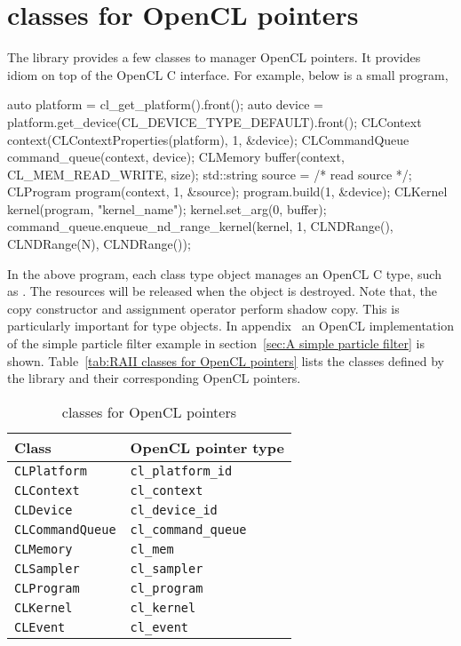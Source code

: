 \section{\protect\raii classes for OpenCL pointers}
\label{sec:RAII classes for OpenCL pointers}

The library provides a few classes to manager OpenCL pointers. It provides
\raii idiom on top of the OpenCL C interface. For example, below is a small
program,
\begin{cppcode}
  auto platform = cl_get_platform().front();
  auto device = platform.get_device(CL_DEVICE_TYPE_DEFAULT).front();
  CLContext context(CLContextProperties(platform), 1, &device);
  CLCommandQueue command_queue(context, device);
  CLMemory buffer(context, CL_MEM_READ_WRITE, size);
  std::string source = /* read source */;
  CLProgram program(context, 1, &source);
  program.build(1, &device);
  CLKernel kernel(program, "kernel_name");
  kernel.set_arg(0, buffer);
  command_queue.enqueue_nd_range_kernel(kernel, 1, CLNDRange(), CLNDRange(N),
      CLNDRange());
\end{cppcode}
In the above program, each class type object manages an OpenCL C type, such as
. The resources will be released when the object is
destroyed. Note that, the copy constructor and assignment operator perform
shadow copy. This is particularly important for  type
objects. In appendix~
an OpenCL implementation of the simple particle filter example in
section~\ref{sec:A simple particle filter} is shown. Table~\ref{tab:RAII
  classes for OpenCL pointers} lists the classes defined by the library and
their corresponding OpenCL pointers.

\begin{table}[t]
  \begin{tabu}{X[l]X[l]}
    \toprule
    Class & OpenCL pointer type \\
    \midrule
    \texttt{CLPlatform}     & \texttt{cl\_platform\_id}   \\
    \texttt{CLContext}      & \texttt{cl\_context}        \\
    \texttt{CLDevice}       & \texttt{cl\_device\_id}     \\
    \texttt{CLCommandQueue} & \texttt{cl\_command\_queue} \\
    \texttt{CLMemory}       & \texttt{cl\_mem}            \\
    \texttt{CLSampler}      & \texttt{cl\_sampler}        \\
    \texttt{CLProgram}      & \texttt{cl\_program}        \\
    \texttt{CLKernel}       & \texttt{cl\_kernel}         \\
    \texttt{CLEvent}        & \texttt{cl\_event}          \\
    \bottomrule
  \end{tabu}
  \caption{\protect\raii classes for OpenCL pointers}
  \label{tab:RAII classes for OpenCL pointers}
\end{table}


